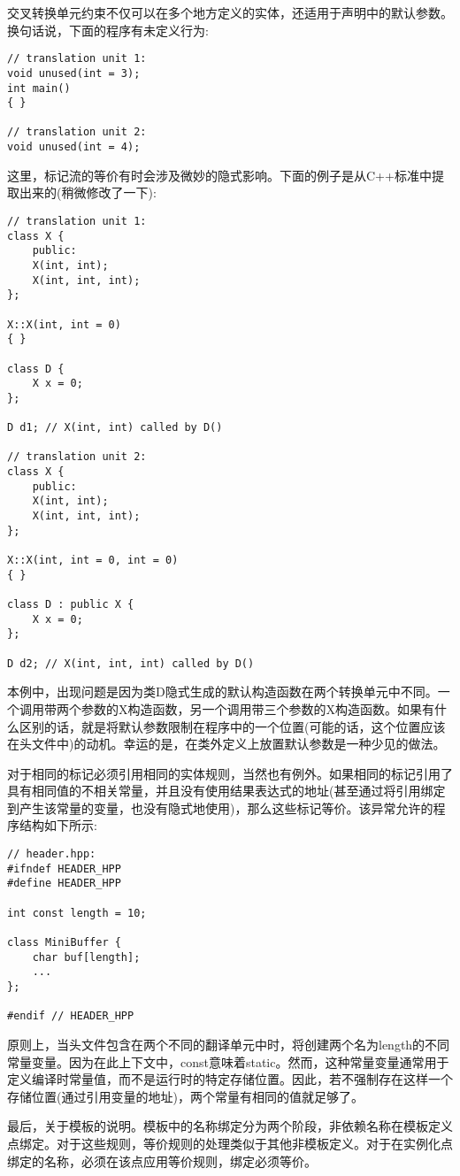 交叉转换单元约束不仅可以在多个地方定义的实体，还适用于声明中的默认参数。换句话说，下面的程序有未定义行为:

\begin{lstlisting}[style=styleCXX]
// translation unit 1:
void unused(int = 3);
int main()
{ }

// translation unit 2:
void unused(int = 4);
\end{lstlisting}

这里，标记流的等价有时会涉及微妙的隐式影响。下面的例子是从C++标准中提取出来的(稍微修改了一下):

\begin{lstlisting}[style=styleCXX]
// translation unit 1:
class X {
	public:
	X(int, int);
	X(int, int, int);
};

X::X(int, int = 0)
{ }

class D {
	X x = 0;
};

D d1; // X(int, int) called by D()

// translation unit 2:
class X {
	public:
	X(int, int);
	X(int, int, int);
};

X::X(int, int = 0, int = 0)
{ }

class D : public X {
	X x = 0;
};

D d2; // X(int, int, int) called by D()
\end{lstlisting}

本例中，出现问题是因为类D隐式生成的默认构造函数在两个转换单元中不同。一个调用带两个参数的X构造函数，另一个调用带三个参数的X构造函数。如果有什么区别的话，就是将默认参数限制在程序中的一个位置(可能的话，这个位置应该在头文件中)的动机。幸运的是，在类外定义上放置默认参数是一种少见的做法。

对于相同的标记必须引用相同的实体规则，当然也有例外。如果相同的标记引用了具有相同值的不相关常量，并且没有使用结果表达式的地址(甚至通过将引用绑定到产生该常量的变量，也没有隐式地使用)，那么这些标记等价。该异常允许的程序结构如下所示:

\begin{lstlisting}[style=styleCXX]
// header.hpp:
#ifndef HEADER_HPP
#define HEADER_HPP

int const length = 10;

class MiniBuffer {
	char buf[length];
	...
};

#endif // HEADER_HPP
\end{lstlisting}

原则上，当头文件包含在两个不同的翻译单元中时，将创建两个名为length的不同常量变量。因为在此上下文中，const意味着static。然而，这种常量变量通常用于定义编译时常量值，而不是运行时的特定存储位置。因此，若不强制存在这样一个存储位置(通过引用变量的地址)，两个常量有相同的值就足够了。

最后，关于模板的说明。模板中的名称绑定分为两个阶段，非依赖名称在模板定义点绑定。对于这些规则，等价规则的处理类似于其他非模板定义。对于在实例化点绑定的名称，必须在该点应用等价规则，绑定必须等价。





